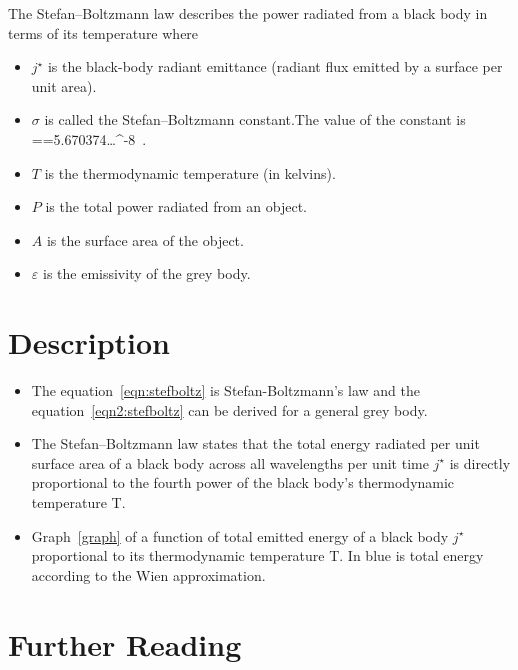 \documentclass[a4paper, 12pt]{article}
\begin{document}
The Stefan–Boltzmann law describes the power radiated from a black body in terms of its temperature where

\begin{itemize}
        \item $j^{\star}$ is the black-body radiant emittance (radiant flux emitted by a surface per unit area).
        \item $\sigma$ is called the Stefan–Boltzmann constant.The value of the constant is {\displaystyle \sigma ={}=5.670374\ldots {}^{-8}\, .}

        \item $T$ is the thermodynamic temperature (in kelvins).
        \item $P$ is the total power radiated from an object.
        \item $A$ is the surface area of the object.
        \item $\varepsilon$ is the emissivity of the grey body.

\end{itemize}

\section{Description}

\begin{itemize}

    \item The equation~\ref{eqn:stefboltz} is Stefan-Boltzmann's law and the equation~\ref{eqn2:stefboltz} can be derived for a general grey body.

    \item The Stefan–Boltzmann law states that the total energy radiated per unit surface area of a black body across all wavelengths per unit time $j^{\star}$ is directly proportional to the fourth power of the black body's thermodynamic temperature T.

    \item Graph~\ref{graph} of a function of total emitted energy of a black body $j^{\star}$ proportional to its thermodynamic temperature T. In blue is total energy according to the Wien approximation.

\end{itemize}

\section{Further Reading}
\end{document}

